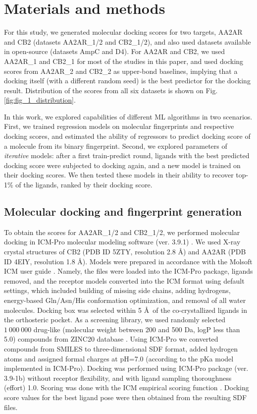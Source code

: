 \section{Materials and methods}
For this study, we generated molecular docking scores for two targets, AA2AR and CB2 (datasets AA2AR\_1/2 and CB2\_1/2), and also used datasets available in open-source \cite{ultralarge_docking_first} (datasets AmpC and D4). For AA2AR and CB2, we used AA2AR\_1 and CB2\_1 for most of the studies in this paper, and used docking scores from AA2AR\_2 and CB2\_2 as upper-bond baselines, implying that a docking itself (with a different random seed) is the best predictor for the docking result. Distribution of the scores from all six datasets is shown on Fig. \ref{fig:fig_1_distribution}.

In this work, we explored capabilities of different ML algorithms in two scenarios. First, we trained regression models on molecular fingerprints and respective docking scores, and estimated the ability of regressors to predict docking score of a molecule from its binary fingerprint. Second, we explored parameters of \textit{iterative} models: after a first train-predict round, ligands with the best predicted docking score were subjected to docking again, and a new model is trained on their docking scores. We then tested these models in their ability to recover top-1\% of the ligands, ranked by their docking score.


\subsection{Molecular docking and fingerprint generation}
To obtain the scores for AA2AR\_1/2 and CB2\_1/2, we performed molecular docking in ICM-Pro molecular modeling software (ver. 3.9.1) \cite{molsoft_guide}. We used X-ray crystal structures of CB2 (PDB ID 5ZTY, resolution 2.8 \AA) and AA2AR (PDB ID 4EIY, resolution 1.8 \AA). Models were prepared in accordance with the Molsoft ICM user guide \cite{molsoft_guide}. Namely, the files were loaded into the ICM-Pro package, ligands removed, and the receptor models converted into the ICM format using default settings, which included building of missing side chains, adding hydrogens, energy-based Gln/Asn/His conformation optimization, and removal of all water molecules. Docking box was selected within 5 \AA \ of the co-crystallized ligands in the orthosteric pocket. As a screening library, we used randomly selected $1\ 000\ 000$ drug-like (molecular weight between 200 and 500 Da, logP less than 5.0) compounds from ZINC20 database \cite{Irwin2020ZINC20Discovery}. Using ICM-Pro we converted compounds from SMILES to three-dimensional SDF  format, added hydrogen atoms and assigned formal charges at pH=7.0 (according to the pKa model implemented in ICM-Pro). Docking was performed using ICM-Pro package (ver. 3.9-1b) without receptor flexibility, and with ligand sampling thoroughness (effort) 1.0. Scoring was done with the ICM empirical scoring function \cite{abagyan_biased_1994}. Docking score values for the best ligand pose were then obtained from the resulting SDF files.


